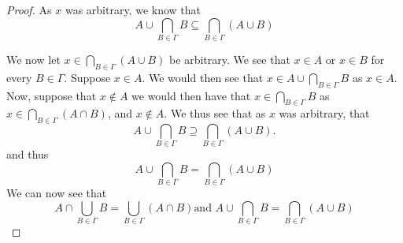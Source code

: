 \begin{proof}
    As $x$ was arbitrary, we know that 
    $$
        A \cup \bigcap_{B\in \Gamma} B \subseteq \bigcap_{B\in \Gamma} (A \cup B)
    $$

    We now let $x \in \bigcap_{B\in \Gamma} (A \cup B)$ be arbitrary.  We see
    that $x \in A$ or $x \in B$ for every $B \in \Gamma$.  Suppose $x \in A$. We
    would then see that $x \in A \cup \bigcap_{B\in\Gamma} B$ as $x \in A$.
    Now, suppose that $x \notin A$ we would then have that $x \in
    \bigcap_{B\in\Gamma} B$ as $x \in \bigcap_{B\in\Gamma} (A \cap B)$, and $x
    \notin A$. We thus see that as $x$ was arbitrary, that 
    $$
        A \cup \bigcap_{B\in \Gamma} B \supseteq \bigcap_{B\in \Gamma} (A \cup
        B).
    $$
    and thus 
    $$
        A \cup \bigcap_{B\in \Gamma} B = \bigcap_{B\in \Gamma} (A \cup B)
    $$
    We can now see that
    $$
        A \cap  \bigcup_{B\in \Gamma} B = \bigcup_{B\in \Gamma} (A \cap B)\text{
        and  } A \cup \bigcap_{B\in \Gamma} B = \bigcap_{B\in \Gamma} (A \cup B)
    $$

\end{proof}
